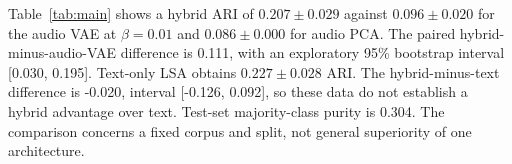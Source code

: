 Table~\ref{tab:main} shows a hybrid ARI of $0.207\pm0.029$ against $0.096\pm0.020$ for the audio VAE at $\beta=0.01$ and $0.086\pm0.000$ for audio PCA. The paired hybrid-minus-audio-VAE difference is 0.111, with an exploratory 95\% bootstrap interval [0.030, 0.195]. Text-only LSA obtains $0.227\pm0.028$ ARI. The hybrid-minus-text difference is -0.020, interval [-0.126, 0.092], so these data do not establish a hybrid advantage over text. Test-set majority-class purity is 0.304. The comparison concerns a fixed corpus and split, not general superiority of one architecture.
